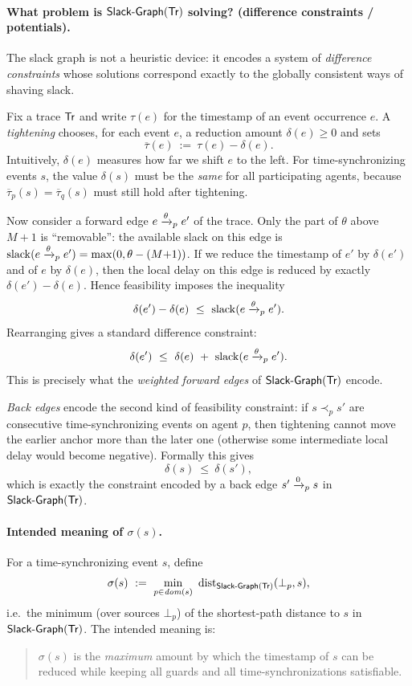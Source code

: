 \paragraph*{What problem is $\mathrm{\textsf{Slack-Graph}}(\textsf{Tr})$ solving? (difference constraints / potentials).}
The slack graph is not a heuristic device: it encodes a system of \emph{difference constraints}
whose solutions correspond exactly to the globally consistent ways of shaving slack.

Fix a trace $\textsf{Tr}$ and write $\tau(e)$ for the timestamp of an event occurrence $e$.
A \emph{tightening} chooses, for each event $e$, a reduction amount $\delta(e)\ge 0$ and sets
\[
\overline{\tau}(e)\ :=\ \tau(e)-\delta(e).
\]
Intuitively, $\delta(e)$ measures how far we shift $e$ to the left.
For time-synchronizing events $s$, the value $\delta(s)$ must be the \emph{same} for all participating agents,
because $\overline{\tau}_p(s)=\overline{\tau}_q(s)$ must still hold after tightening.

Now consider a forward edge $e \xrightarrow{\theta}_p e'$ of the trace.
Only the part of $\theta$ above $M{+}1$ is ``removable'': the available slack on this edge is
$\mathrm{slack}(e\xrightarrow{\theta}_p e')=\max(0,\theta-(M{+}1))$.
If we reduce the timestamp of $e'$ by $\delta(e')$ and of $e$ by $\delta(e)$, then the local delay on this edge
is reduced by exactly $\delta(e')-\delta(e)$.
Hence feasibility imposes the inequality
\[
\delta(e')-\delta(e)\ \le\ \mathrm{slack}(e\xra{\theta}_p e') .
\]
Rearranging gives a standard difference constraint:
\[
\delta(e')\ \le\ \delta(e)\ +\ \mathrm{slack}(e\xra{\theta}_p e') .
\]
This is precisely what the \emph{weighted forward edges} of $\mathrm{\textsf{Slack-Graph}}(\textsf{Tr})$ encode.

\smallskip
\emph{Back edges} encode the second kind of feasibility constraint: if $s \prec_p s'$ are consecutive
time-synchronizing events on agent $p$, then tightening cannot move the earlier anchor more than the later one
(otherwise some intermediate local delay would become negative).
Formally this gives
\[
\delta(s)\ \le\ \delta(s') ,
\]
which is exactly the constraint encoded by a back edge $s' \xrightarrow{0}_p s$ in $\mathrm{\textsf{Slack-Graph}}(\textsf{Tr})$.

\paragraph*{Intended meaning of $\sigma(s)$.}
For a time-synchronizing event $s$, define
\[
\sigma(s)\ :=\ \min_{p\in\dom(s)}\ \mathrm{dist}_{\Sl(\tr)}(\bot_p,s),
\]
i.e.\ the minimum (over sources $\bot_p$) of the shortest-path distance to $s$ in $\mathrm{\textsf{Slack-Graph}}(\textsf{Tr})$.
The intended meaning is:
\begin{quote}
$\sigma(s)$ is the \emph{maximum} amount by which the timestamp of $s$ can be reduced while keeping all
guards and all time-synchronizations satisfiable.
\end{quote}


